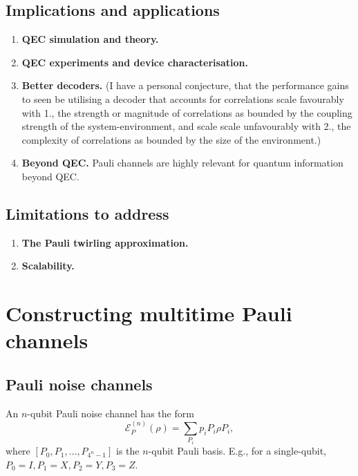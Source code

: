 \documentclass{article}
\begin{document}
\subsection{Implications and applications}
\begin{enumerate}
    \item \textbf{QEC simulation and theory.}
    \item \textbf{QEC experiments and device characterisation.}
    \item \textbf{Better decoders.} (I have a personal conjecture, that the performance gains to seen be utilising a decoder that accounts for correlations scale favourably with 1., the strength or magnitude of correlations as bounded by the coupling strength of the system-environment, and scale scale unfavourably with 2., the complexity of correlations as bounded by the size of the environment.)
    \item \textbf{Beyond QEC.} Pauli channels are highly relevant for quantum information beyond QEC.
\end{enumerate}

\subsection{Limitations to address}
\begin{enumerate}
    \item \textbf{The Pauli twirling approximation.}

    \item \textbf{Scalability.}
\end{enumerate}

\section{Constructing multitime Pauli channels}
\subsection{Pauli noise channels}
An $n$-qubit Pauli noise channel has the form
\begin{equation}\label{eq:pauli_channel}
    \mathcal{E}_P^{(n)}(\rho) = \sum_{P_i} p_iP_i\rho P_i,
\end{equation}
where $[P_0, P_1,\dots,P_{4^n-1}]$ is the $n$-qubit Pauli basis. E.g., for a single-qubit, $P_0=I, P_1=X, P_2=Y, P_3=Z$.
\end{document}
